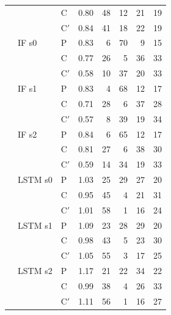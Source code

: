 \begin{scriptsize}
\begin{longtable}{lllrrrrr}
 &  & C & 0.80 & 48 & 12 & 21 & 19 \\
 &  & C$'$ & 0.84 & 41 & 18 & 22 & 19 \\
 & IF s0 & P & 0.83 & 6 & 70 & 9 & 15 \\
 &  & C & 0.77 & 26 & 5 & 36 & 33 \\
 &  & C$'$ & 0.58 & 10 & 37 & 20 & 33 \\
 & IF s1 & P & 0.83 & 4 & 68 & 12 & 17 \\
 &  & C & 0.71 & 28 & 6 & 37 & 28 \\
 &  & C$'$ & 0.57 & 8 & 39 & 19 & 34 \\
 & IF s2 & P & 0.84 & 6 & 65 & 12 & 17 \\
 &  & C & 0.81 & 27 & 6 & 38 & 30 \\
 &  & C$'$ & 0.59 & 14 & 34 & 19 & 33 \\
 & LSTM s0 & P & 1.03 & 25 & 29 & 27 & 20 \\
 &  & C & 0.95 & 45 & 4 & 21 & 31 \\
 &  & C$'$ & 1.01 & 58 & 1 & 16 & 24 \\
 & LSTM s1 & P & 1.09 & 23 & 28 & 29 & 20 \\
 &  & C & 0.98 & 43 & 5 & 23 & 30 \\
 &  & C$'$ & 1.05 & 55 & 3 & 17 & 25 \\
 & LSTM s2 & P & 1.17 & 21 & 22 & 34 & 22 \\
 &  & C & 0.99 & 38 & 4 & 26 & 33 \\
 &  & C$'$ & 1.11 & 56 & 1 & 16 & 27 \\
\end{longtable}
\end{scriptsize}
